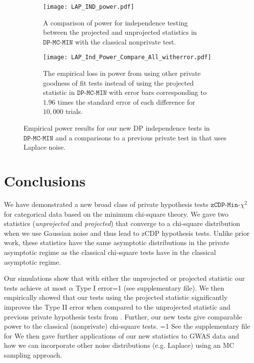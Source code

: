 \documentclass[twoside,letterpaper]{article} \usepackage{aistats2017}
\theoremstyle{definition}
\theoremstyle{remark}
\begin{document}
\begin{figure}
\begin{center}
\begin{subfigure}{.45\textwidth}
\begin{flushleft}
\texttt{[image: LAP\_IND\_power.pdf]}
\caption{A comparison of power for independence testing between the projected and unprojected statistics in $\texttt{DP-MC-MIN}$ with the classical nonprivate test.  \label{fig:LAP_power_ind}}
\end{flushleft}
\end{subfigure}
\hspace{10mm}
\begin{subfigure}{.1\textwidth}
\end{subfigure}
\begin{subfigure}{.45\textwidth}
\begin{flushright}
\texttt{[image: LAP\_Ind\_Power\_Compare\_All\_witherror.pdf]}
\caption{The empirical loss in power from using other private goodness of fit tests instead of using the projected statistic in $\texttt{DP-MC-MIN}$ with error bars corresponding to $1.96$ times the standard error of each difference for $10,000$ trials. \label{fig:LAPpower_ind_compare}}
\end{flushright}
\end{subfigure}
\caption{Empirical power results for our new DP independence tests in $\texttt{DP-MC-MIN}$ and a comparisons to a previous private test in \cite{GLRV16} that uses Laplace noise.}
\end{center}
\end{figure}

\fi

\section{Conclusions}\label{sec:conclusions}
We have demonstrated a new broad class of private hypothesis tests ${\texttt{zCDP-Min-$\chi^2$}}$ for categorical data based on the minimum chi-square theory.  We gave two statistics (\emph{unprojected} and \emph{projected}) that converge to a chi-square distribution when we use Gaussian noise and thus lead to zCDP hypothesis tests.  Unlike prior work, these statistics have the same asymptotic distributions in the private asymptotic regime as the classical chi-square tests have in the classical asymptotic regime. 

Our simulations show that with either the unprojected or projected statistic our tests achieve at most $\alpha$ Type I error=1 (see supplementary file)\fi.  We then empirically showed that our tests using the projected statistic significantly improves the Type II error when compared to the unprojected statistic and previous private hypothesis tests from \cite{GLRV16}.  Further, our new tests give comparable power to the classical (nonprivate) chi-square tests. =1 See the supplementary file for \else We then gave \fi further applications of our new statistics to GWAS data and how we can incorporate other noise distributions (e.g. Laplace) using an MC sampling approach.
\end{document}
